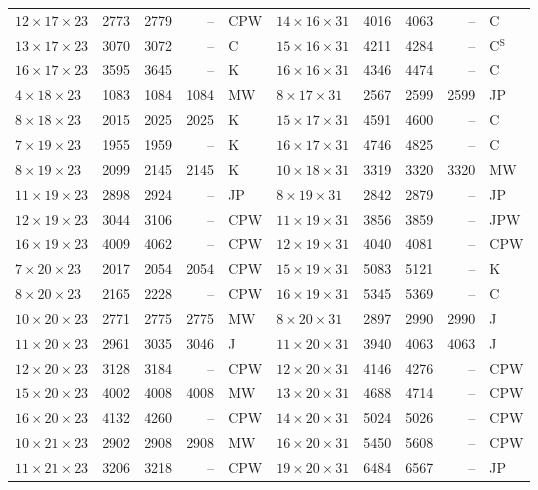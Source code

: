 \begin{longtable}{@{}lrrrl@{\hspace{6mm}}lrrrl@{}}
$12{\times}17{\times}23$ & 2773 & 2779 & -- & CPW & $14{\times}16{\times}31$ & 4016 & 4063 & -- & C\\
$13{\times}17{\times}23$ & 3070 & 3072 & -- & C & $15{\times}16{\times}31$ & 4211 & 4284 & -- & C$^{\mathrm{S}}$\\
$16{\times}17{\times}23$ & 3595 & 3645 & -- & K & $16{\times}16{\times}31$ & 4346 & 4474 & -- & C\\
$4{\times}18{\times}23$ & 1083 & 1084 & 1084 & MW & $8{\times}17{\times}31$ & 2567 & 2599 & 2599 & JP\\
$8{\times}18{\times}23$ & 2015 & 2025 & 2025 & K & $15{\times}17{\times}31$ & 4591 & 4600 & -- & C\\
$7{\times}19{\times}23$ & 1955 & 1959 & -- & K & $16{\times}17{\times}31$ & 4746 & 4825 & -- & C\\
$8{\times}19{\times}23$ & 2099 & 2145 & 2145 & K & $10{\times}18{\times}31$ & 3319 & 3320 & 3320 & MW\\
$11{\times}19{\times}23$ & 2898 & 2924 & -- & JP & $8{\times}19{\times}31$ & 2842 & 2879 & -- & JP\\
$12{\times}19{\times}23$ & 3044 & 3106 & -- & CPW & $11{\times}19{\times}31$ & 3856 & 3859 & -- & JPW\\
$16{\times}19{\times}23$ & 4009 & 4062 & -- & CPW & $12{\times}19{\times}31$ & 4040 & 4081 & -- & CPW\\
$7{\times}20{\times}23$ & 2017 & 2054 & 2054 & CPW & $15{\times}19{\times}31$ & 5083 & 5121 & -- & K\\
$8{\times}20{\times}23$ & 2165 & 2228 & -- & CPW & $16{\times}19{\times}31$ & 5345 & 5369 & -- & C\\
$10{\times}20{\times}23$ & 2771 & 2775 & 2775 & MW & $8{\times}20{\times}31$ & 2897 & 2990 & 2990 & J\\
$11{\times}20{\times}23$ & 2961 & 3035 & 3046 & J & $11{\times}20{\times}31$ & 3940 & 4063 & 4063 & J\\
$12{\times}20{\times}23$ & 3128 & 3184 & -- & CPW & $12{\times}20{\times}31$ & 4146 & 4276 & -- & CPW\\
$15{\times}20{\times}23$ & 4002 & 4008 & 4008 & MW & $13{\times}20{\times}31$ & 4688 & 4714 & -- & CPW\\
$16{\times}20{\times}23$ & 4132 & 4260 & -- & CPW & $14{\times}20{\times}31$ & 5024 & 5026 & -- & CPW\\
$10{\times}21{\times}23$ & 2902 & 2908 & 2908 & MW & $16{\times}20{\times}31$ & 5450 & 5608 & -- & CPW\\
$11{\times}21{\times}23$ & 3206 & 3218 & -- & CPW & $19{\times}20{\times}31$ & 6484 & 6567 & -- & JP\\

\end{longtable}
